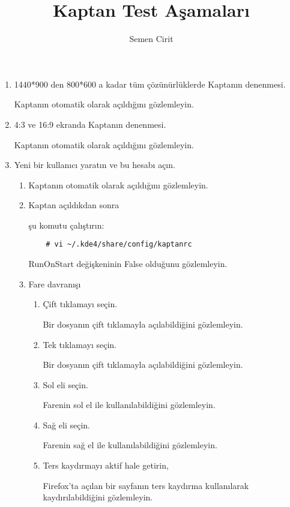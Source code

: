 \documentclass[a4paper,10pt]{article}
\title{Kaptan Test Aşamaları}
\author{Semen Cirit}
\begin{document}
\maketitle

\begin{enumerate}

\item 1440*900 den 800*600 a kadar tüm çözünürlüklerde Kaptanın denenmesi.

	Kaptanın otomatik olarak açıldığını gözlemleyin.
\item 4:3 ve 16:9 ekranda Kaptanın denenmesi.

	Kaptanın otomatik olarak açıldığını gözlemleyin.

\item Yeni bir kullanıcı yaratın ve bu hesabı açın.

\begin{enumerate}
    \item Kaptanın otomatik olarak açıldığını gözlemleyin.
    \item Kaptan açıldıkdan sonra

          şu komutu çalıştırın:
\begin{verbatim}
    # vi ~/.kde4/share/config/kaptanrc
\end{verbatim} 
        RunOnStart değişkeninin False olduğunu gözlemleyin.

    \item Fare davranışı
    \begin{enumerate}
        \item Çift tıklamayı seçin.

           Bir dosyanın çift tıklamayla açılabildiğini gözlemleyin.
        \item Tek tıklamayı seçin.

            Bir dosyanın çift tıklamayla açılabildiğini gözlemleyin.
        \item Sol eli seçin.

            Farenin sol el ile kullanılabildiğini gözlemleyin.
        \item Sağ eli seçin.

            Farenin sağ el ile kullanılabildiğini gözlemleyin.

        \item Ters kaydırmayı aktif hale getirin,

            Firefox'ta açılan bir sayfanın ters kaydırma kullanılarak kaydırılabildiğini gözlemleyin.
    \end{enumerate}
\end{enumerate}


\end{enumerate}
\end{document}
